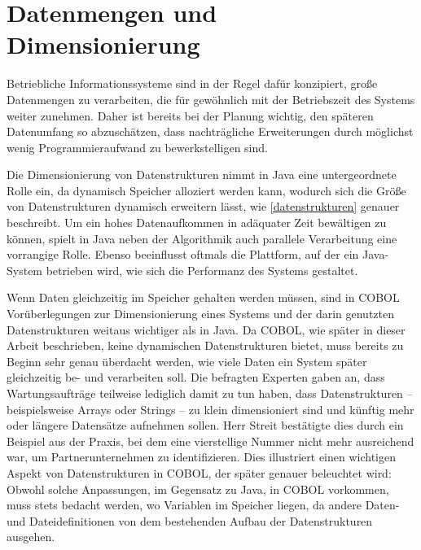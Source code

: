 \section{Datenmengen und Dimensionierung}

Betriebliche Informationssysteme sind in der Regel dafür konzipiert, große Datenmengen zu verarbeiten, die für gewöhnlich mit der Betriebszeit des Systems weiter zunehmen. Daher ist bereits bei der Planung wichtig, den späteren Datenumfang so abzuschätzen, dass nachträgliche Erweiterungen durch möglichst wenig Programmieraufwand zu bewerkstelligen sind.

Die Dimensionierung von Datenstrukturen nimmt in Java eine untergeordnete Rolle ein, da dynamisch Speicher alloziert werden kann, wodurch sich die Größe von Datenstrukturen dynamisch erweitern lässt, wie \autoref{datenstrukturen} genauer beschreibt. Um ein hohes Datenaufkommen in adäquater Zeit bewältigen zu können, spielt in Java neben der Algorithmik auch parallele Verarbeitung eine vorrangige Rolle. Ebenso beeinflusst oftmals die Plattform, auf der ein Java-System betrieben wird, wie sich die Performanz des Systems gestaltet.

Wenn Daten gleichzeitig im Speicher gehalten werden müssen, sind in COBOL Vorüberlegungen zur Dimensionierung eines Systems und der darin genutzten Datenstrukturen weitaus wichtiger als in Java. Da COBOL, wie später in dieser Arbeit beschrieben, keine dynamischen Datenstrukturen bietet, muss bereits zu Beginn sehr genau überdacht werden, wie viele Daten ein System später gleichzeitig be- und verarbeiten soll. Die befragten Experten gaben an, dass Wartungsaufträge teilweise lediglich damit zu tun haben, dass Datenstrukturen -- beispielsweise Arrays oder Strings -- zu klein dimensioniert sind und künftig mehr oder längere Datensätze aufnehmen sollen. Herr Streit bestätigte dies durch ein Beispiel aus der Praxis, bei dem eine vierstellige Nummer nicht mehr ausreichend war, um Partnerunternehmen zu identifizieren.  Dies illustriert einen wichtigen Aspekt von Datenstrukturen in COBOL, der später genauer beleuchtet wird: Obwohl solche Anpassungen, im Gegensatz zu Java, in COBOL vorkommen, muss stets bedacht werden, wo Variablen im Speicher liegen, da andere Daten- und Dateidefinitionen von dem bestehenden Aufbau der Datenstrukturen ausgehen.